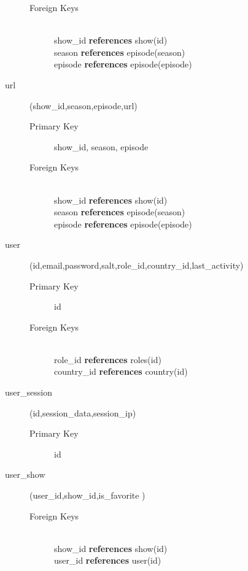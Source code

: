 \begin{description}
\begin{description}
			\item[Foreign Keys] \hfill \\ show\_id \textbf{references} show(id) \hfill \\ season \textbf{references} episode(season) \hfill \\ episode \textbf{references} episode(episode)
		\end{description}
	\item[url] (show\_id,season,episode,url)
		\begin{description}
			\item[Primary Key] show\_id, season, episode
			\item[Foreign Keys] \hfill \\ show\_id \textbf{references} show(id) \hfill \\ season \textbf{references} episode(season) \hfill \\ episode \textbf{references} episode(episode)
		\end{description}
	\item[user] (id,email,password,salt,role\_id,country\_id,last\_activity)
		\begin{description}
			\item[Primary Key] id
			\item[Foreign Keys] \hfill \\ role\_id \textbf{references} roles(id) \hfill \\ country\_id \textbf{references} country(id)
		\end{description}
	\item[user\_session] (id,session\_data,session\_ip)
		\begin{description}
			\item[Primary Key] id
		\end{description}
	\item[user\_show] (user\_id,show\_id,is\_favorite  )
		\begin{description}
			\item[Foreign Keys] \hfill \\ show\_id \textbf{references} show(id) \hfill \\ user\_id \textbf{references} user(id)
		\end{description}
	
\end{description}
